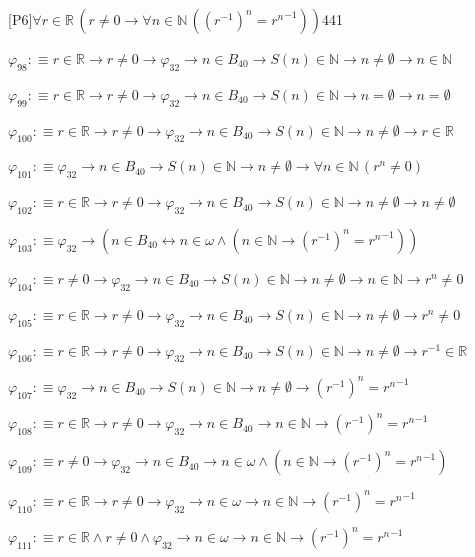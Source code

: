 \begin{fullproof}{[P6]}{$\forall r \in \mathbb{R}\,(r \neq 0 \to \forall n \in \mathbb{N}\,({{(r^{-1})}^{n}} = {{r}^{n}}^{-1}))$}{441}
\begin{abbrevlist}
\item $\varphi_{98} :\equiv r \in \mathbb{R} \to r \neq 0 \to \varphi_{32} \to n \in B_{40} \to S(n) \in \mathbb{N} \to n \neq \emptyset \to n \in \mathbb{N}$
\item $\varphi_{99} :\equiv r \in \mathbb{R} \to r \neq 0 \to \varphi_{32} \to n \in B_{40} \to S(n) \in \mathbb{N} \to n = \emptyset \to n = \emptyset$
\item $\varphi_{100} :\equiv r \in \mathbb{R} \to r \neq 0 \to \varphi_{32} \to n \in B_{40} \to S(n) \in \mathbb{N} \to n \neq \emptyset \to r \in \mathbb{R}$
\item $\varphi_{101} :\equiv \varphi_{32} \to n \in B_{40} \to S(n) \in \mathbb{N} \to n \neq \emptyset \to \forall n \in \mathbb{N}\,({{r}^{n}} \neq 0)$
\item $\varphi_{102} :\equiv r \in \mathbb{R} \to r \neq 0 \to \varphi_{32} \to n \in B_{40} \to S(n) \in \mathbb{N} \to n \neq \emptyset \to n \neq \emptyset$
\item $\varphi_{103} :\equiv \varphi_{32} \to (n \in B_{40} \leftrightarrow n \in \omega \land (n \in \mathbb{N} \to {{(r^{-1})}^{n}} = {{r}^{n}}^{-1}))$
\item $\varphi_{104} :\equiv r \neq 0 \to \varphi_{32} \to n \in B_{40} \to S(n) \in \mathbb{N} \to n \neq \emptyset \to n \in \mathbb{N} \to {{r}^{n}} \neq 0$
\item $\varphi_{105} :\equiv r \in \mathbb{R} \to r \neq 0 \to \varphi_{32} \to n \in B_{40} \to S(n) \in \mathbb{N} \to n \neq \emptyset \to {{r}^{n}} \neq 0$
\item $\varphi_{106} :\equiv r \in \mathbb{R} \to r \neq 0 \to \varphi_{32} \to n \in B_{40} \to S(n) \in \mathbb{N} \to n \neq \emptyset \to r^{-1} \in \mathbb{R}$
\item $\varphi_{107} :\equiv \varphi_{32} \to n \in B_{40} \to S(n) \in \mathbb{N} \to n \neq \emptyset \to {{(r^{-1})}^{n}} = {{r}^{n}}^{-1}$
\item $\varphi_{108} :\equiv r \in \mathbb{R} \to r \neq 0 \to \varphi_{32} \to n \in B_{40} \to n \in \mathbb{N} \to {{(r^{-1})}^{n}} = {{r}^{n}}^{-1}$
\item $\varphi_{109} :\equiv r \neq 0 \to \varphi_{32} \to n \in B_{40} \to n \in \omega \land (n \in \mathbb{N} \to {{(r^{-1})}^{n}} = {{r}^{n}}^{-1})$
\item $\varphi_{110} :\equiv r \in \mathbb{R} \to r \neq 0 \to \varphi_{32} \to n \in \omega \to n \in \mathbb{N} \to {{(r^{-1})}^{n}} = {{r}^{n}}^{-1}$
\item $\varphi_{111} :\equiv r \in \mathbb{R} \land r \neq 0 \land \varphi_{32} \to n \in \omega \to n \in \mathbb{N} \to {{(r^{-1})}^{n}} = {{r}^{n}}^{-1}$

\end{abbrevlist}
\end{fullproof}
